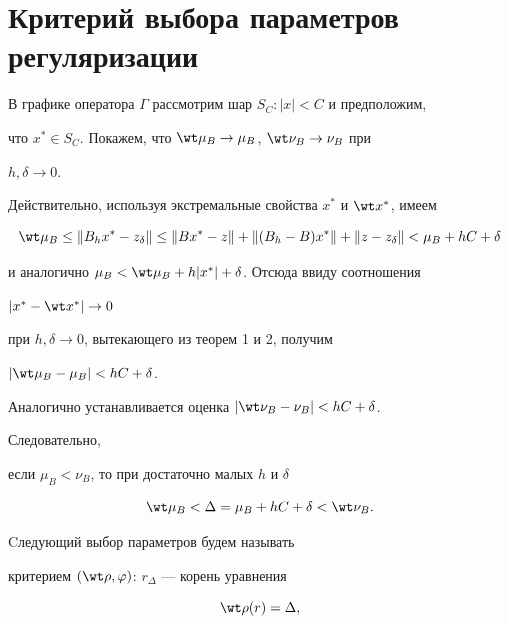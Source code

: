  


\section{Критерий выбора параметров регуляризации} 


 


В графике оператора $\Gamma$ рассмотрим шар $S_C:|x|<C$ и предположим, 


что $x^*\in S_C$. Покажем, что $\wt\mu_B\to\mu_B$, $\wt\nu_B\to\nu_B$ при 


$h,\delta\to0$. 


 


Действительно, используя экстремальные свойства $x^*$ и $\wt x^*$, имеем 


\begin{equation} 


\wt\mu_B\le\|B_h x^*-z_\delta\|\le \|B x^*-z\|+


\|(B_h-B)x^*\|+\|z-z_\delta\|<\mu_B+h C+\delta 


\end{equation} 


и аналогично $\mu_B<\wt\mu_B+h|x^*|+\delta$. Отсюда ввиду соотношения 


$|x^*-\wt x^*|\to 0$ 


при $h,\delta\to0$, вытекающего из теорем 1 и 2, получим 


$|\wt\mu_B-\mu_B|<h C+\delta$. 


Аналогично устанавливается оценка $|\wt\nu_B-\nu_B|<h C+\delta$. 


Следовательно, 


если $\mu_B<\nu_B$, то при достаточно малых $h$ и $\delta$ 


\begin{equation} 


\wt\mu_B<\Delta=\mu_B+h C+\delta<\wt\nu_B. 


\end{equation} 


 


Cледующий выбор параметров будем называть  


критерием $(\wt\rho,\varphi)$: $r_\Delta$ --- корень уравнения 


\begin{equation} 


\wt\rho(r)=\Delta, 


\end{equation} 


